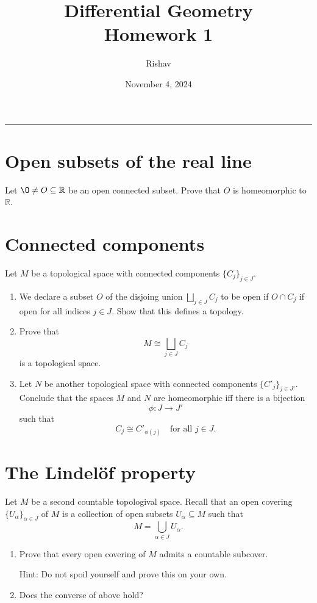 \documentclass{article}
\title{Differential Geometry\\Homework 1}
\date{November 4, 2024}
\author{Rishav}
\begin{document}
\maketitle
\hrule

\section{Open subsets of the real line}
\label{section:one}

Let $\O\neq O\subseteq\mathbb{R}$ be an open connected subset. Prove that $O$ is homeomorphic to $\mathbb{R}$.

\section{Connected components}
\label{section:two}

Let $M$ be a topological space with connected components $\{C_{j}\}_{j\in J}$.

\begin{enumerate}[label=\roman*.]
  \item We declare a subset $O$ of the disjoing union $\bigsqcup_{j\in J}C_{j}$ to be open if $O\cap C_{j}$ if open for all indices $j\in J$. Show that this defines a topology.

  \item Prove that $$M\cong\bigsqcup_{j\in J}C_{j}$$ is a topological space.

  \item Let $N$ be another topological space with connected components $\{C'_{j}\}_{j\in J'}$. Conclude that the spaces $M$ and $N$ are homeomorphic iff there is a bijection $$\phi:J\rightarrow J'$$ such that $$C_{j}\cong C'_{\phi(j)}\quad\text{for all }j\in J.$$
\end{enumerate}

\section{The Lindelöf property}

Let $M$ be a second countable topologival space. Recall that an open covering $\{U_{\alpha}\}_{\alpha\in J}$ of $M$ is a collection of open subsets $U_{\alpha}\subseteq M$ such that $$M=\bigcup_{\alpha\in J}U_{\alpha}.$$

\begin{enumerate}[label=\roman*.]
  \item Prove that every open covering of $M$ admits a countable subcover.

  {\footnotesize Hint: Do not spoil yourself and prove this on your own.}

  \item Does the converse of above hold?
\end{enumerate}
\end{document}
